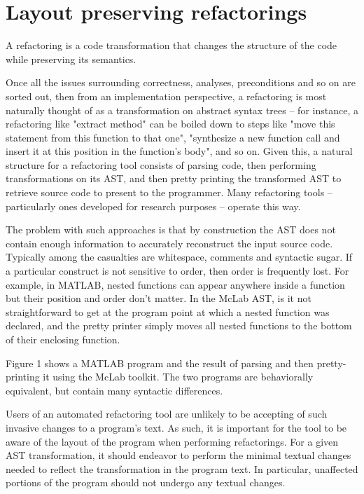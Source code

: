 \section{Layout preserving refactorings}

A refactoring is a code transformation that changes the structure of the code
while preserving its semantics.

Once all the issues surrounding correctness, analyses, preconditions and so on
are sorted out, then from an implementation perspective, a refactoring is most
naturally thought of as a transformation on abstract syntax trees -- for
instance, a refactoring like "extract method" can be boiled down to steps like
"move this statement from this function to that one", "synthesize a new function
call and insert it at this position in the function's body", and so on. Given this,
a natural structure for a refactoring tool consists of parsing code, then performing
transformations on its AST, and then pretty printing the transformed AST to retrieve
source code to present to the programmer. Many refactoring tools -- particularly
ones developed for research purposes -- operate this way.

The problem with such approaches is that by construction the AST does not contain
enough information to accurately reconstruct the input source code. Typically
among the casualties are whitespace, comments and syntactic sugar. If a particular
construct is not sensitive to order, then order is frequently lost. For example,
in MATLAB, nested functions can appear anywhere inside a function but their position
and order don't matter. In the McLab AST, is it not straightforward to get at the
program point at which a nested function was declared, and the pretty printer simply
moves all nested functions to the bottom of their enclosing function.

Figure 1 shows a MATLAB program and the result of parsing and then pretty-printing
it using the McLab toolkit. The two programs are behaviorally equivalent, but
contain many syntactic differences.

Users of an automated refactoring tool are unlikely to be accepting of such invasive
changes to a program's text. As such, it is important for the tool to be aware of
the layout of the program when performing refactorings. For a given AST
transformation, it should endeavor to perform the minimal textual changes needed
to reflect the transformation in the program text. In particular, unaffected
portions of the program should not undergo any textual changes.

